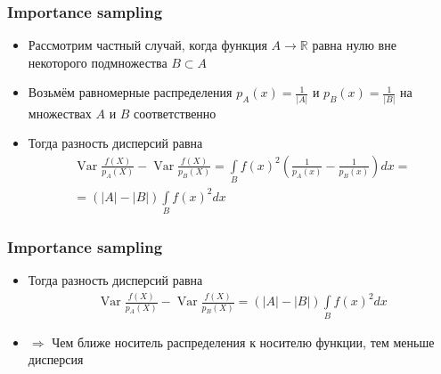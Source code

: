 \documentclass[handout,10pt]{beamer}
\begin{document}
\begin{frame}
\frametitle{Importance sampling}
\begin{itemize}
\item Рассмотрим частный случай, когда функция \begin{math}A\rightarrow \mathbb R\end{math} равна нулю вне некоторого подмножества \begin{math}B\subset A\end{math}
\pause
\item Возьмём равномерные распределения \begin{math}p_A(x)=\frac{1}{|A|}\end{math} и \begin{math}p_B(x)=\frac{1}{|B|}\end{math} на множествах \begin{math}A\end{math} и \begin{math}B\end{math} соответственно
\pause
\item Тогда разность дисперсий равна
\begin{gather*}
\operatorname{Var}\frac{f(X)}{p_A(X)} - \operatorname{Var}\frac{f(X)}{p_B(X)} = \int\limits_B f(x)^2 \left(\frac{1}{p_A(x)} - \frac{1}{p_B(x)}\right)dx = \\
= (|A| - |B|) \int\limits_B f(x)^2 dx
\end{gather*}
\end{itemize}
\end{frame}

\begin{frame}
\frametitle{Importance sampling}
\begin{itemize}
\item Тогда разность дисперсий равна
\begin{gather*}
\operatorname{Var}\frac{f(X)}{p_A(X)} - \operatorname{Var}\frac{f(X)}{p_B(X)} = (|A| - |B|) \int\limits_B f(x)^2 dx
\end{gather*}
\pause
\item \begin{math}\Longrightarrow\end{math} Чем ближе носитель распределения к носителю функции, тем меньше дисперсия
\end{itemize}
\end{frame}
\end{document}

